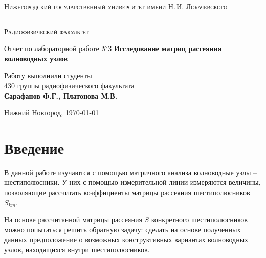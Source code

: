 \documentclass[a4paper,12pt]{article}
\def\labauthor{Сарафанов Ф.Г., Платонова М.В.}
\def\labnumber{3}
\def\labtheme{Исследование матриц рассеяния \\[0.4em] волноводных узлов}
\begin{document}
\begin{titlepage}
\begin{center}

{\textsc{Нижегородский государственный университет имени Н.\,И. Лобачевского}}
\vskip 2pt \hrule \vskip 3pt
{\textsc{Радиофизический факультет}}

\vfill


{{\LARGE Отчет по лабораторной работе №\labnumber}\vskip 12pt {\Huge \bfseries \labtheme}}

	
\vspace{2cm}
{\large Работу выполнили студенты \\[-0.25em] 430 группы радиофизического факультата \\[0.5em] {\Large \bfseries \labauthor}}



\end{center}

\vfill
	
	
	
\begin{center}
	{Нижний Новгород, \today}
\end{center}

\end{titlepage}

\tableofcontents
\newpage

\section*{Введение}
\label{sec:input}

В данной работе изучаются с помощью матричного анализа волноводные узлы -- шестиполюсники. У них с помощью измерительной линии измеряются величины, позволяющие рассчитать коэффициенты матрицы рассеяния шестиполюсников $S_{km}$. 

На основе рассчитанной матрицы рассеяния $S$ конкретного шестиполюсников можно попытаться решить обратную задачу: сделать на основе полученных данных предположение о возможных конструктивных вариантах волноводных узлов, находящихся внутри шестиполюсников.
\end{document}
